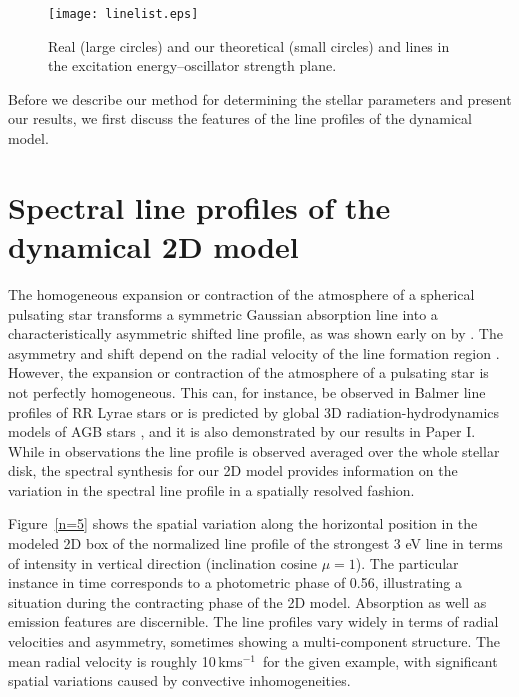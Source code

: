 \documentclass{aa}
\newcommand{\kmos}{kms$^{-1}$}
\begin{document}
\begin{figure}
\begin{center}
\texttt{[image: linelist.eps]}
\caption{Real (large circles) and our theoretical (small circles) 
    and   lines in the excitation 
   energy--oscillator strength plane.\label{linelist}}
\end{center}
\end{figure} 
 
Before we describe our method for determining the stellar parameters and
present our results, we first discuss the features of the line profiles of the
dynamical model.

\section{Spectral line profiles of the dynamical 2D model  }
The homogeneous expansion or contraction of the atmosphere of a spherical
pulsating star transforms a symmetric Gaussian absorption line into a
characteristically asymmetric shifted line profile, as was shown
early on by
\citet{1919PNAS....5..417S}.  The asymmetry and shift depend on the radial
velocity of the line formation region \citep{2006A&A...453..309N}.  However,
the expansion or contraction of the atmosphere of a pulsating star is not
perfectly homogeneous.  This can, for instance, be observed in Balmer line
profiles of RR Lyrae stars \citep{2011AJ....141....6P} or is predicted by
global 3D radiation-hydrodynamics models of AGB stars
\citep{2017A&A...600A.137F}, and it is also demonstrated by our results in Paper I.
While in observations the line profile is observed averaged over the whole
stellar disk, the spectral synthesis for our 2D model provides information on
the variation in the spectral line profile in a spatially resolved fashion.

Figure~\ref{n=5}  shows the spatial variation along the horizontal position
in the modeled 2D box of
the normalized line profile of the strongest  3 eV line in terms
of intensity in vertical direction (inclination cosine $\mu=1$). The particular
instance in time corresponds to a photometric phase of 0.56, illustrating a
situation during the contracting phase of the 2D model. Absorption as well as
emission features are discernible. The line profiles vary
widely in terms of radial velocities and asymmetry, sometimes showing a
multi-component structure. The mean radial velocity is roughly 10\,\kmos\ for
the given example, with significant spatial variations caused by convective
inhomogeneities.
\end{document}
